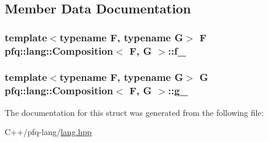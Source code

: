 \subsection{Member Data Documentation}
\hypertarget{structpfq_1_1lang_1_1Composition_a347bd26bc6d78fe7540e7e5f641fe69d}{
\subsubsection[{f\+\_\+}]{\setlength{\rightskip}{0pt plus 5cm}template$<$typename F, typename G$>$ F {\bf pfq\+::lang\+::\+Composition}$<$ F, G $>$\+::f\+\_\+}}\label{structpfq_1_1lang_1_1Composition_a347bd26bc6d78fe7540e7e5f641fe69d}
\hypertarget{structpfq_1_1lang_1_1Composition_aabe9600a5e6184509c5ac8ae9685271e}{
\subsubsection[{g\+\_\+}]{\setlength{\rightskip}{0pt plus 5cm}template$<$typename F, typename G$>$ G {\bf pfq\+::lang\+::\+Composition}$<$ F, G $>$\+::g\+\_\+}}\label{structpfq_1_1lang_1_1Composition_aabe9600a5e6184509c5ac8ae9685271e}


The documentation for this struct was generated from the following file\+:\begin{DoxyCompactItemize}
\item 
C++/pfq-\/lang/\hyperlink{lang_8hpp}{lang.\+hpp}\end{DoxyCompactItemize}
